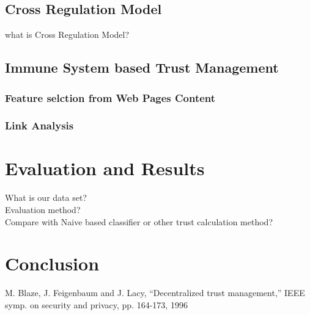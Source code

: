 \documentclass{llncs}
\begin{document}
\subsection{Cross Regulation Model}
what is Cross Regulation Model?
\subsection{Immune System based Trust Management}

\subsubsection{Feature selction from Web Pages Content}

\subsubsection{Link Analysis}

\section{Evaluation and Results}
What is our data set? \\

Evaluation method?\\

Compare with Naive based classifier or other trust calculation method?\\

\section{Conclusion}

%

\begin{thebibliography}{99.}%
M. Blaze, J. Feigenbaum and J. Lacy, “Decentralized trust management,” IEEE
symp. on security and privacy, pp. 164-173, 1996


\end{thebibliography}
\end{document}
